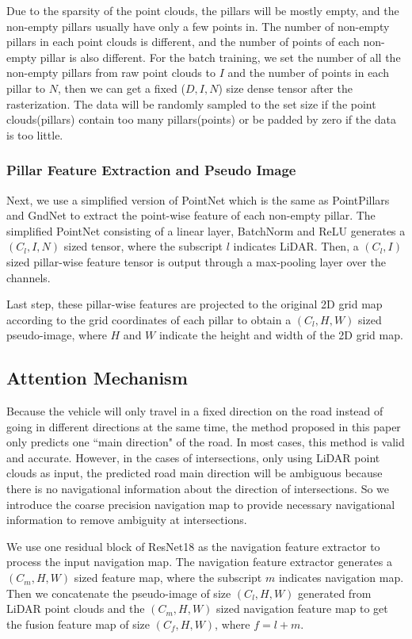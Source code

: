 \documentclass[letterpaper,10 pt,conference]{ieeeconf}  %
\begin{document}
Due to the sparsity of the point clouds, the pillars will be mostly empty, and the non-empty pillars usually have only a few points in. The number of non-empty pillars in each point clouds is different, and the number of points of each non-empty pillar is also different. For the batch training, we set the number of all the non-empty pillars from raw point clouds to $I$ and the number of points in each pillar to $N$, then we can get a fixed ($D, I, N$) size dense tensor after the rasterization. The data will be randomly sampled to the set size if the point clouds(pillars) contain too many pillars(points) or be padded by zero if the data is too little.

\subsubsection{Pillar Feature Extraction and Pseudo Image}
Next, we use a simplified version of PointNet which is the same as PointPillars\cite{12} and GndNet\cite{GND} to extract the point-wise feature of each non-empty pillar. The simplified PointNet consisting of a linear layer, BatchNorm\cite{bn} and ReLU generates a $(C_l, I, N)$ sized tensor, where the subscript $l$ indicates LiDAR. Then, a $(C_l, I)$ sized pillar-wise feature tensor is output through a max-pooling layer over the channels.

Last step, these pillar-wise features are projected to the original 2D grid map according to the grid coordinates of each pillar to obtain a $(C_l, H, W)$ sized pseudo-image, where $H$ and $W$ indicate the height and width of the 2D grid map.

\subsection{Attention Mechanism} \label{why_navg}
Because the vehicle will only travel in a fixed direction on the road instead of going in different directions at the same time, the method proposed in this paper only predicts one ``main direction" of the road. In most cases, this method is valid and accurate. However, in the cases of intersections, only using LiDAR point clouds as input, the predicted road main direction will be ambiguous because there is no navigational information about the direction of intersections. So we introduce the coarse precision navigation map to provide necessary navigational information to remove ambiguity at intersections.

We use one residual block of ResNet18 as the navigation feature extractor to process the input navigation map. The navigation feature extractor generates a $(C_m, H, W)$ sized feature map, where the subscript $m$ indicates navigation map. Then we concatenate the pseudo-image of size $(C_l, H, W)$ generated from LiDAR point clouds and the $(C_m, H, W)$ sized navigation feature map to get the fusion feature map of size $(C_f, H, W)$, where $f=l+m$.
\end{document}
